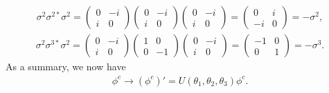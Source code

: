 \documentclass[11pt]{article}
\begin{document}
\begin{eqnarray}
  \sigma^2 \sigma^{2*} \sigma^2=
  \begin{pmatrix}
    0&-i\\i&0
  \end{pmatrix}
  \begin{pmatrix}
    0&-i\\i&0
  \end{pmatrix}
  \begin{pmatrix}
    0&-i\\i&0
  \end{pmatrix}
  =  \begin{pmatrix}
    0&i\\-i&0
  \end{pmatrix}
  =-\sigma^2,
\end{eqnarray}
\begin{eqnarray}
  \sigma^2 \sigma^{3*} \sigma^2=
  \begin{pmatrix}
    0&-i\\i&0
  \end{pmatrix}
  \begin{pmatrix}
    1&0\\0&-1
  \end{pmatrix}
  \begin{pmatrix}
    0&-i\\i&0
  \end{pmatrix}
  =  \begin{pmatrix}
    -1&0\\0&1
  \end{pmatrix}
  =-\sigma^3.
\end{eqnarray}
As a summary, we now have
\begin{eqnarray}
  \phi^c \to (\phi^c)'=U(\theta_1,\theta_2,\theta_3) \phi^c.
\end{eqnarray}
\end{document}
